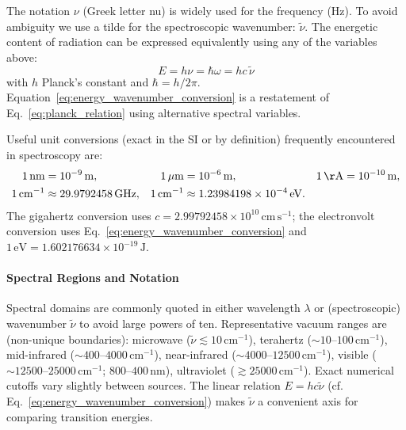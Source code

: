 \noindent The notation $\nu$ (Greek letter nu) is widely used for the frequency (Hz). To avoid ambiguity we use a tilde for the spectroscopic wavenumber: $\tilde{\nu}$. The energetic content of radiation can be expressed equivalently using any of the variables above:
\begin{equation}
	E = h\nu = \hbar\omega = h c \, \tilde{\nu}
	\label{eq:energy_wavenumber_conversion}
\end{equation}
with $h$ Planck's constant and $\hbar = h/2\pi$. Equation~\eqref{eq:energy_wavenumber_conversion} is a restatement of Eq.~\eqref{eq:planck_relation} using alternative spectral variables.

\noindent Useful unit conversions (exact in the SI or by definition) frequently encountered in spectroscopy are:
\begin{align}
	1\,\mathrm{nm}      & = 10^{-9}\,\mathrm{m},                        &
	1\,\mu\mathrm{m}    & = 10^{-6}\,\mathrm{m},                        &
	1\,\mathrm{\AA}     & = 10^{-10}\,\mathrm{m},                         \\
	1\,\mathrm{cm}^{-1} & \approx 29.9792458\,\mathrm{GHz},             &
	1\,\mathrm{cm}^{-1} & \approx 1.23984198\times10^{-4}\,\mathrm{eV}.
	\label{eq:unit_conversions}
\end{align}
The gigahertz conversion uses $c = 2.99792458\times10^{10}\,\mathrm{cm\,s^{-1}}$; the electronvolt conversion uses Eq.~\eqref{eq:energy_wavenumber_conversion} and $1\,\mathrm{eV} = 1.602176634\times10^{-19}\,\mathrm{J}$.

\paragraph{Spectral Regions and Notation}
\noindent Spectral domains are commonly quoted in either wavelength $\lambda$ or (spectroscopic) wavenumber $\tilde{\nu}$ to avoid large powers of ten. Representative vacuum ranges are (non-unique boundaries): microwave ($\tilde{\nu} \lesssim 10\,\mathrm{cm}^{-1}$), terahertz ($\sim 10$--$100\,\mathrm{cm}^{-1}$), mid-infrared ($\sim 400$--$4000\,\mathrm{cm}^{-1}$), near-infrared ($\sim 4000$--$12500\,\mathrm{cm}^{-1}$), visible ($\sim 12500$--$25000\,\mathrm{cm}^{-1}$; $800$--$400\,\mathrm{nm}$), ultraviolet ($\gtrsim 25000\,\mathrm{cm}^{-1}$). Exact numerical cutoffs vary slightly between sources. The linear relation $E = h c \tilde{\nu}$ (cf. Eq.~\eqref{eq:energy_wavenumber_conversion}) makes $\tilde{\nu}$ a convenient axis for comparing transition energies.


